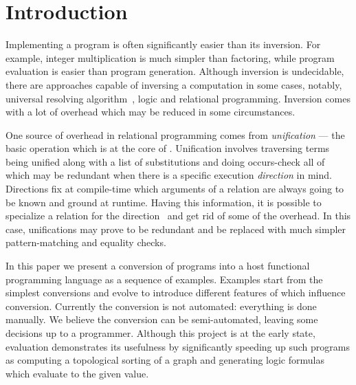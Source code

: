 \section{Introduction}

Implementing a program is often significantly easier than its inversion.
For example, integer multiplication is much simpler than factoring, while program evaluation is easier than program generation.
Although inversion is undecidable, there are approaches capable of inversing a computation in some cases, notably, universal resolving algorithm~\cite{abramov2002principles}, logic and relational programming.
Inversion comes with a lot of overhead which may be reduced in some circumstances.

One source of overhead in relational programming comes from \emph{unification} --- the basic operation which is at the core of \mk.
Unification involves traversing terms being unified along with a list of substitutions and doing occurs-check all of which may be redundant when there is a specific execution \emph{direction} in mind.
Directions fix at compile-time which arguments of a relation are always going to be known and ground at runtime.
Having this information, it is possible to specialize a relation for the direction~\cite{EPTCS341.5} and get rid of some of the overhead.
In this case, unifications may prove to be redundant and be replaced with much simpler pattern-matching and equality checks.

In this paper we present a conversion of \mk programs into a host functional programming language as a sequence of examples.
Examples start from the simplest conversions and evolve to introduce different features of \mk which influence conversion.
Currently the conversion is not automated: everything is done manually.
We believe the conversion can be semi-automated, leaving some decisions up to a programmer.
Although this project is at the early state, evaluation demonstrates its usefulness by significantly speeding up such programs as computing a topological sorting of a graph and generating logic formulas which evaluate to the given value.

